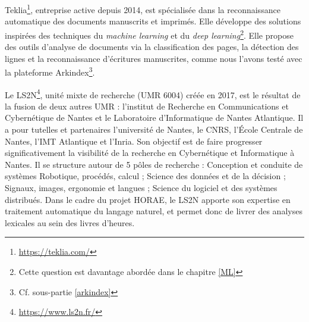 \documentclass[a4paper,12pt,twoside]{book}
\begin{document}
Teklia\footnote{\url{https://teklia.com/}}, entreprise active depuis 2014, est spécialisée dans la reconnaissance automatique des documents manuscrits et imprimés. Elle développe des solutions inspirées des techniques du \textit{machine learning} et du \textit{deep learning}\footnote{Cette question est davantage abordée dans le chapitre \ref{ML}}. Elle propose des outils d'analyse de documents via la classification des pages, la détection des lignes et la reconnaissance d'écritures manuscrites, comme nous l'avons testé avec la plateforme Arkindex\footnote{Cf. sous-partie \ref{arkindex}}.

Le LS2N\footnote{\url{https://www.ls2n.fr/}}, unité mixte de recherche (UMR 6004) créée en 2017, est le résultat de la fusion de deux autres UMR : l’institut de Recherche en Communications et Cybernétique de Nantes et le Laboratoire d’Informatique de Nantes Atlantique. Il a pour
tutelles et partenaires l’université de Nantes, le CNRS, l’École Centrale de Nantes, l'IMT
Atlantique et l'Inria. Son objectif est de faire progresser significativement la visibilité de la recherche en Cybernétique et Informatique à Nantes. Il se structure autour de 5 pôles de recherche : Conception et conduite de systèmes Robotique, procédés, calcul ; Science des données et de la décision ; Signaux, images, ergonomie et langues ; Science du logiciel et des systèmes distribués. Dans le cadre du projet HORAE, le LS2N apporte son expertise en traitement automatique du langage naturel, et permet donc de livrer des analyses lexicales au sein des livres d'heures. \\
\end{document}
